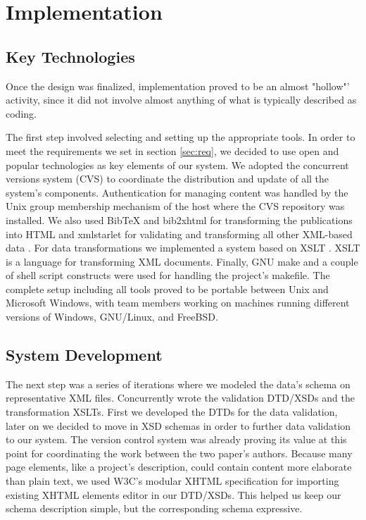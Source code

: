 \documentclass[10pt]{article}
\begin{document}
\section{Implementation}

\subsection{Key Technologies}

Once the design was finalized,
implementation proved to be an almost "hollow"' activity,
since it did not involve almost anything of what
is typically described as coding.

The first step involved selecting and setting up the
appropriate tools. In order to meet the requirements we set in section \ref{sec:req}, 
we decided to use open and popular
technologies as key elements of our system.
We adopted the concurrent versions system
(CVS) \cite{BF01} \cite{CVS} to coordinate the distribution
and update of all the system's components.
Authentication for managing content was handled by the
Unix group membership mechanism of the host where the
CVS repository was installed.
We also used
BibTeX \cite{Pa88} and bib2xhtml \cite{BibXHMTL} for transforming the publications
into HTML and
xmlstarlet \cite{Gru04} for validating and transforming
all other XML-based data \cite{W3C_XML}.
For data transformations we 
implemented a system based on XSLT \cite{W3C_XSLT}. XSLT is a language for transforming XML documents.
Finally, GNU make \cite{gnu_make} and a couple of shell script
constructs were used for handling the project's makefile.
The complete setup including all tools proved to be portable
between Unix and Microsoft Windows, with team members working
on machines running different versions of Windows, GNU/Linux,
and FreeBSD.

\subsection{System Development}

The next step was a series of iterations where we
modeled the data's schema on representative XML
files. Concurrently wrote the validation DTD/XSDs 
and the transformation XSLTs. First we developed the DTDs 
for the data validation, later on we decided to move in XSD schemas in order to
further data validation to our system.
The version control system was already proving its value
at this point
for coordinating the work between the two paper's authors.
Because many page elements, like a project's description,
could contain content more elaborate than plain text,
we used W3C's modular XHTML specification for
importing existing XHTML elements editor in our DTD/XSDs.
This helped us keep our schema description simple,
but the corresponding schema expressive.
\end{document}
